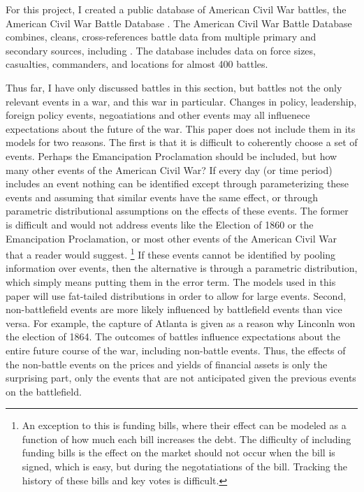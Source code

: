 For this project, I created a public database of American Civil War battles, the American Civil War Battle Database \parencite{Arnold2015b}.
The American Civil War Battle Database combines, cleans, cross-references battle data from multiple primary and secondary sources, including \textcites{Phisterer1883}{Livermore1900}{Bodart1908}{dyer1908_war_rebel}{KennedyConservation1998}{CWSAC1993}{cwsac2012}.
The database includes data on force sizes, casualties, commanders, and locations for almost 400 battles.

Thus far, I have only discussed battles in this section, but battles not the only relevant events in a war, and this war in particular.
Changes in policy, leadership, foreign policy events, negoatiations and other events may all influenece expectations about the future of the war.
This paper does not include them in its models for two reasons. 
The first is that it is difficult to coherently choose a set of events. 
Perhaps the Emancipation Proclamation should be included, but how many other events of the American Civil War? 
If every day (or time period) includes an event nothing can be identified except through parameterizing these events and assuming that similar events have the same effect, or through parametric distributional assumptions on the effects of these events.%
The former is difficult and would not address events like the Election of 1860 or the Emancipation Proclamation, or most other events of the American Civil War that a reader would suggest.%
\footnote{
  An exception to this is funding bills, where their effect can be modeled as a function of how much each bill increases the debt.
  The difficulty of including funding bills is the effect on the market should not occur when the bill is signed, which is easy, but during the negotatiations of the bill.
  Tracking the history of these bills and key votes is difficult.
}
If these events cannot be identified by pooling information over events, then the alternative is through a parametric distribution, which simply means putting them in the error term. 
The models used in this paper will use fat-tailed distributions in order to allow for large events.
Second, non-battlefield events are more likely influenced by battlefield events than vice versa. 
For example, the capture of Atlanta is given as a reason why Linconln won the election of 1864.
The outcomes of battles influence expectations about the entire future course of the war, including non-battle events. 
Thus, the effects of the non-battle events on the prices and yields of financial assets is only the surprising part, only the events that are not anticipated given the previous events on the battlefield.


